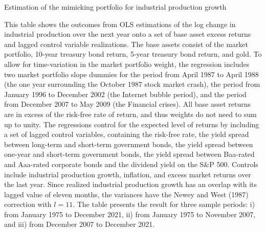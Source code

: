 \documentclass[11pt,halfline,a4paper]{ouparticle}
\begin{document}
\begin{table}
  \begin{threeparttable}
    \caption{Estimation of the mimicking portfolio for industrial production growth}
    \label{tbl:mimick}
    
    \begin{tablenotes} 
    \footnotesize
    \item This table shows the outcomes from OLS estimations of the log change in industrial production over the next year onto a set of base asset excess returns and lagged control variable realizations. The base assets consist of the market portfolio, 10-year treasury bond return, 5-year treasury bond return, and gold. To allow for time-variation in the market portfolio weight, the regression includes two market portfolio slope dummies for the period from April 1987 to April 1988 (the one year surrounding the October 1987 stock market crash), the period from January 1996 to December 2002 (the Internet bubble period), and the period from December 2007 to May 2009 (the Financial crises). All base asset returns are in excess of the risk-free rate of return, and thus weights do not need to sum up to unity. The regressions control for the expected level of returns by including a set of lagged control variables, containing the risk-free rate, the yield spread between long-term and short-term government bonds, the yield spread between one-year and short-term government bonds, the yield spread between Baa-rated and Aaa-rated corporate bonds and the dividend yield on the S\&P 500. Controls include industrial production growth, inflation, and excess market returns over the last year. Since realized industrial production growth has an overlap with its lagged value of eleven months, the variances have the Newey and West (1987) correction with $l = 11$. The table presents the result for three sample periods: i) from January 1975 to December 2021, ii) from January 1975 to November 2007, and iii) from December 2007 to December 2021.
    \end{tablenotes}
  \end{threeparttable}
\end{table}

\newpage
\end{document}

